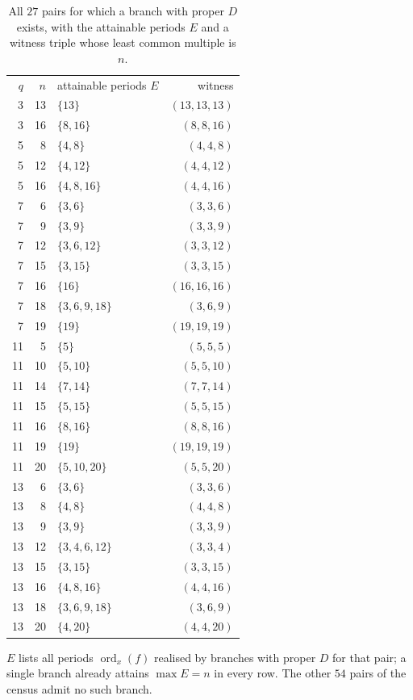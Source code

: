 \documentclass[11pt,reqno]{amsart}
\theoremstyle{definition}
\theoremstyle{remark}
\newcommand{\ord}{\operatorname{ord}}
\begin{document}
\begin{table}[t]
\centering
\caption{All $27$ pairs for which a branch with proper $D$ exists, with the attainable periods $E$ and a witness triple whose least common multiple is $n$.\label{tab:dconstr}}
\small
\begin{tabular}{rrlr}
\toprule
$q$ & $n$ & attainable periods $E$ & witness \\
3 & 13 & $\{13\}$ & $(13,13,13)$ \\
3 & 16 & $\{8,16\}$ & $(8,8,16)$ \\
5 & 8 & $\{4,8\}$ & $(4,4,8)$ \\
5 & 12 & $\{4,12\}$ & $(4,4,12)$ \\
5 & 16 & $\{4,8,16\}$ & $(4,4,16)$ \\
7 & 6 & $\{3,6\}$ & $(3,3,6)$ \\
7 & 9 & $\{3,9\}$ & $(3,3,9)$ \\
7 & 12 & $\{3,6,12\}$ & $(3,3,12)$ \\
7 & 15 & $\{3,15\}$ & $(3,3,15)$ \\
7 & 16 & $\{16\}$ & $(16,16,16)$ \\
7 & 18 & $\{3,6,9,18\}$ & $(3,6,9)$ \\
7 & 19 & $\{19\}$ & $(19,19,19)$ \\
11 & 5 & $\{5\}$ & $(5,5,5)$ \\
11 & 10 & $\{5,10\}$ & $(5,5,10)$ \\
11 & 14 & $\{7,14\}$ & $(7,7,14)$ \\
11 & 15 & $\{5,15\}$ & $(5,5,15)$ \\
11 & 16 & $\{8,16\}$ & $(8,8,16)$ \\
11 & 19 & $\{19\}$ & $(19,19,19)$ \\
11 & 20 & $\{5,10,20\}$ & $(5,5,20)$ \\
13 & 6 & $\{3,6\}$ & $(3,3,6)$ \\
13 & 8 & $\{4,8\}$ & $(4,4,8)$ \\
13 & 9 & $\{3,9\}$ & $(3,3,9)$ \\
13 & 12 & $\{3,4,6,12\}$ & $(3,3,4)$ \\
13 & 15 & $\{3,15\}$ & $(3,3,15)$ \\
13 & 16 & $\{4,8,16\}$ & $(4,4,16)$ \\
13 & 18 & $\{3,6,9,18\}$ & $(3,6,9)$ \\
13 & 20 & $\{4,20\}$ & $(4,4,20)$ \\
\bottomrule
\end{tabular}

\smallskip
\parbox{\linewidth}{\footnotesize $E$ lists all periods $\ord_x(f)$ realised by branches with proper $D$ for that pair; a single branch already attains $\max E=n$ in every row. The other $54$ pairs of the census admit no such branch.}
\end{table}
\end{document}
